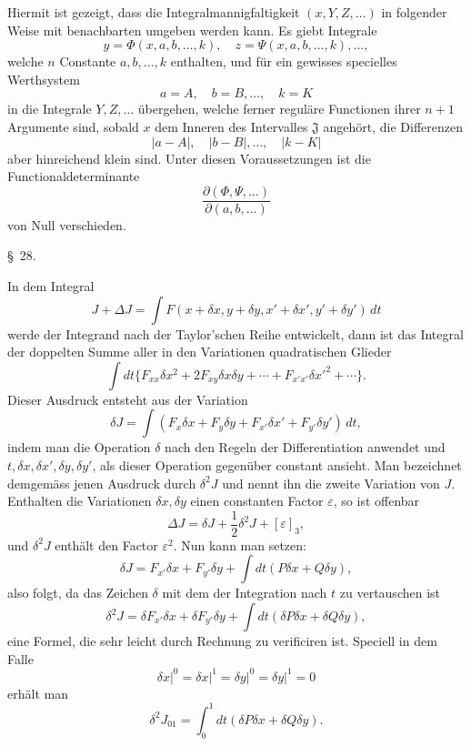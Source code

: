 \documentclass[11pt,a4paper,leqno]{article}
\begin{document}
Hiermit ist gezeigt, dass die Integralmannigfaltigkeit $(x,Y,Z,\ldots)$ in folgender Weise mit benachbarten umgeben werden kann. Es giebt Integrale
\[
y=\Phi(x,a,b,\ldots,k),\quad z=\Psi(x,a,b,\ldots,k),\ldots,
\]
welche $n$ Constante $a,b,\ldots,k$ enthalten, und für ein gewisses specielles Werthsystem
\[
a=A,\quad b=B,\ldots,\quad k=K
\]
in die Integrale $Y,Z,\ldots$ übergehen, welche ferner reguläre Functionen ihrer $n+1$ Argumente sind, sobald $x$ dem Inneren des Intervalles $\mathfrak J$ angehört, die Differenzen
\[
|a-A|,\quad |b-B|,\ldots,\quad |k-K|
\]
aber hinreichend klein sind. Unter diesen Voraussetzungen ist die Functionaldeterminante
\[
\frac{\partial(\Phi,\Psi,\ldots)}{\partial(a,b,\ldots)}
\]
von Null verschieden.

\begin{center}{\large \S~28.}\end{center}

In dem Integral
\[
J+\Delta J=\int F(x+\delta x,y+\delta y,x'+\delta x',y'+\delta y')\,dt
\]
werde der Integrand nach der Taylor'schen Reihe entwickelt, dann ist das Integral der doppelten Summe aller in den Variationen quadratischen Glieder
\[
\int dt\{F_{xx}\delta x^2+2F_{xy}\delta x\delta y+\cdots+F_{x'x'}\delta x'^2+\cdots\}.
\]
Dieser Ausdruck entsteht aus der Variation
\[
\delta J=\int(F_x\delta x+F_y\delta y+F_{x'}\delta x'+F_{y'}\delta y')\,dt,
\]
indem man die Operation $\delta$ nach den Regeln der Differentiation anwendet und $t,\delta x,\delta x',\delta y,\delta y'$, als dieser Operation gegenüber constant ansieht. Man bezeichnet demgemäss jenen Ausdruck durch $\delta^2J$ und nennt ihn die zweite Variation von $J$. Enthalten die Variationen $\delta x,\delta y$ einen constanten Factor $\varepsilon$, so ist offenbar
\begin{equation}\tag{88}
\Delta J=\delta J+\frac12\delta^2J+[\varepsilon]_3,
\end{equation}
und $\delta^2J$ enthält den Factor $\varepsilon^2$. Nun kann man setzen:
\[
\delta J=F_{x'}\delta x+F_{y'}\delta y+
\int dt(P\delta x+Q\delta y),
\]
also folgt, da das Zeichen $\delta$ mit dem der Integration nach $t$ zu vertauschen ist
\[
\delta^2J=\delta F_{x'}\delta x+\delta F_{y'}\delta y+
\int dt(\delta P\delta x+\delta Q\delta y),
\]
eine Formel, die sehr leicht durch Rechnung zu verificiren ist. Speciell in dem Falle
\[
\left.\delta x\right|^0=\left.\delta x\right|^1=
\left.\delta y\right|^0=\left.\delta y\right|^1=0
\]
erhält man
\[
\delta^2J_{01}=\int_0^1dt(\delta P\delta x+
\delta Q\delta y).
\]
\end{document}
